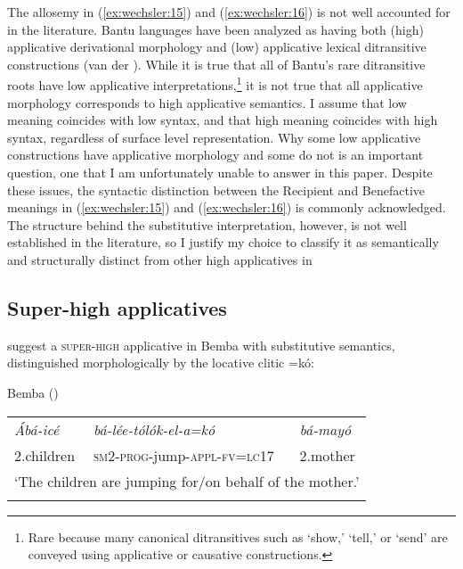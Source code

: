 \documentclass[output=paper]{langscibook}
\begin{document}
The allosemy in (\ref{ex:wechsler:15}) and (\ref{ex:wechsler:16}) is not well accounted for in the literature. Bantu languages have been analyzed as having both (high) applicative derivational morphology and (low) applicative lexical ditransitive constructions (van der \citealt{Wal2017}). While it is true that all of Bantu’s rare ditransitive roots have low applicative interpretations,\footnote{Rare because many canonical ditransitives such as ‘show,’ ‘tell,’ or ‘send’ are conveyed using applicative or causative constructions.}  it is not true that all applicative morphology corresponds to high applicative semantics. I assume that low meaning coincides with low syntax, and that high meaning coincides with high syntax, regardless of surface level representation. Why some low applicative constructions have applicative morphology and some do not is an important question, one that I am unfortunately unable to answer in this paper. Despite these issues, the syntactic distinction between the Recipient and Benefactive meanings in (\ref{ex:wechsler:15}) and (\ref{ex:wechsler:16}) is commonly acknowledged. The structure behind the substitutive interpretation, however, is not well established in the literature, so I justify my choice to classify it as semantically and structurally distinct from other high applicatives in  

\subsection{Super-high applicatives}\label{sec:wechsler:3.3}

\citet{MartenKula2014} suggest a \textsc{super-high} applicative in Bemba with substitutive semantics, distinguished morphologically by the locative clitic =kó:

\ea\label{ex:wechsler:18}
Bemba (\citealt[22]{MartenKula2014})\\

\tablefirsthead{}

\tabletail{}
\tablelasttail{}
\begin{tabularx}{\textwidth}{XXX}
\lsptoprule
{\itshape Ábá-icé}  & \textit{bá-lée-tólók-el-a=kó} & \textit{bá-mayó}\\
2.children & \textsc{sm2}{}-\textsc{prog-}jump-\textsc{appl-fv=lc17} & 2.mother\\
\multicolumn{3}{c}{‘The children are jumping for/on behalf of the mother.’}\\
\lspbottomrule
\end{tabularx}
\z
\end{document}
